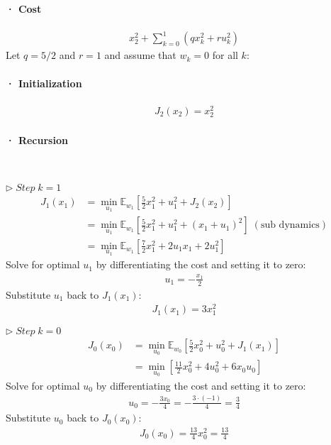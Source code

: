 \documentclass[8pt, a4paper, oneside, justified]{article}
\numberwithin{equation}{section}
\begin{document}
\paragraph*{· Cost}

\begin{align}
    x^2_2+\sum\limits_{k=0}^{1}(qx_k^2+ru_k^2)
\end{align}
Let $q = 5/2$ and $r = 1$ and assume that $w_k=0$ for all $k$:
\paragraph*{· Initialization}

\begin{align}
    J_2(x_2)=x_2^2
\end{align}

\paragraph*{· Recursion}~{}

$\rhd \;Step\;k=1$
\begin{align}
    J_1(x_1)& = \min_ {u_1} \mathbb{E}_{w_1}[\frac{5}{2}x_1^2+u_1^2+J_2(x_2)] \\
    & = \min_ {u_1}\mathbb{E}_{w_1}[\frac{5}{2}x_1^2+u_1^2+(x_1+u_1)^2]\;(\text{sub dynamics}) \\
    & = \min_ {u_1}\mathbb{E}_{w_1}[\frac{7}{2}x_1^2+2u_1x_1+2u_1^2]
\end{align}
\hspace{8pt} Solve for optimal $u_1$ by differentiating the cost and setting it to zero:
\begin{align}
    u_1=-\frac{x_1}{2}
\end{align}
\hspace{8pt} Substitute $u_1$ back to $J_1(x_1)$:
\begin{align}
    J_1(x_1)=3x_1^2
\end{align}

$\rhd \;Step\;k=0$
\begin{align}
    J_0(x_0) & = \min_ {u_0}\mathbb{E}_{w_0}[\frac{5}{2}x_0^2+u_0^2+J_1(x_1)] \\
    & = \min_ {u_0}[\frac{11}{2}x_0^2+4u_0^2+6x_0u_0]
\end{align}
\hspace{8pt} Solve for optimal $u_0$ by differentiating the cost and setting it to zero:
\begin{align}
    u_0 = -\frac{3x_0}{4} = -\frac{3\cdot (-1)}{4} = \frac{3}{4}
\end{align}
\hspace{8pt} Substitute $u_0$ back to $J_0(x_0)$:
\begin{align}
    J_0(x_0) = \frac{13}{4}x_0^2 = \frac{13}{4}
\end{align}
\end{document}
